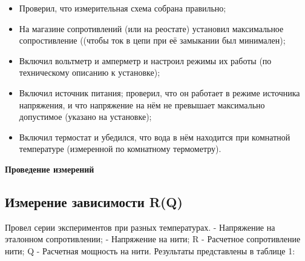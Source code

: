 \hspace{2cm}\begin{minipage}[t]{15cm}
\begin{itemize}
    \item Проверил, что измерительная схема собрана правильно;
    
    \item На магазине сопротивлений (или на реостате) установил максимальное сопростивление  ((чтобы ток в цепи при её замыкании был минимален);
    
    \item Включил вольтметр и амперметр и настроил режимы их работы (по техническому описанию к установке);

    \item Включил источник питания; проверил, что он работает в режиме источника напряжения, и что напряжение на нём не превышает максимально допустимое (указано на установке);
    
    \item Включил термостат и убедился, что вода в нём находится при комнатной температуре (измеренной по комнатному термометру).
    
\end{itemize}
\end{minipage}

\newpage

\begin{center}
    {\Large\bf Проведение измерений}
\end{center}

\subsection{Измерение зависимости R(Q)}
Провел серии экспериментов при разных температурах.  - Напряжение на эталонном сопротивлении;  - Напряжение на нити; R - Расчетное сопротивление нити; Q - Расчетная мощность на нити. Результаты представлены в таблице 1:

